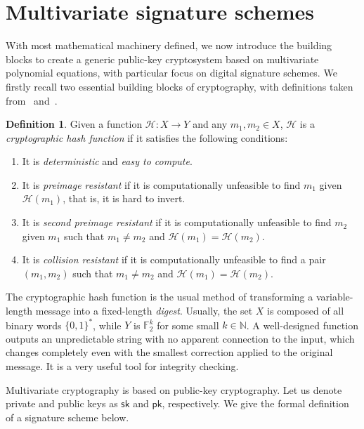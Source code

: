 \documentclass[12pt, a4paper, oneside]{memoir}
\theoremstyle{definition}
\newtheorem{definition}[theorem]{Definition}
\begin{document}
\section{Multivariate signature schemes}\label{sec:mult}

With most mathematical machinery defined, we now introduce the building blocks to create a generic public-key cryptosystem based on multivariate polynomial equations, with particular focus on digital signature schemes. We firstly recall two essential building blocks of cryptography, with definitions taken from~\cite[Section 7.1]{Gathen:2015} and~\cite[Section 6.1]{Goldreich:2004}.

\begin{definition}
  Given a function $\mathcal{H} : X \to Y$ and any $m_{1}, m_{2} \in X$, $\mathcal{H}$ is a \emph{cryptographic hash function} if it satisfies the following conditions:
  
  \begin{enumerate}
    \item It is \emph{deterministic} and \emph{easy to compute}.
    \item It is \emph{preimage resistant} if it is computationally unfeasible to find $m_{1}$ given $\mathcal{H}(m_{1})$, that is, it is hard to invert.
    \item It is \emph{second preimage resistant} if it is computationally unfeasible to find $m_{2}$ given $m_{1}$ such that $m_{1} \neq m_{2}$ and $\mathcal{H}(m_{1}) = \mathcal{H}(m_{2})$.
    \item It is \emph{collision resistant} if it is computationally unfeasible to find a pair $(m_{1}, m_{2})$ such that $m_{1} \neq m_{2}$ and $\mathcal{H}(m_{1}) = \mathcal{H}(m_{2})$.
  \end{enumerate}
\end{definition}

The cryptographic hash function is the usual method of transforming a variable-length message into a fixed-length \emph{digest}. Usually, the set $X$ is composed of all binary words $\{0, 1\}^{*}$, while $Y$ is $\mathbb{F}_{2}^{k}$ for some small $k \in \mathbb{N}$. A well-designed function outputs an unpredictable string with no apparent connection to the input, which changes completely even with the smallest correction applied to the original message. It is a very useful tool for integrity checking.

Multivariate cryptography is based on public-key cryptography. Let us denote private and public keys as $\mathsf{sk}$ and $\mathsf{pk}$, respectively. We give the formal definition of a signature scheme below.
\end{document}
